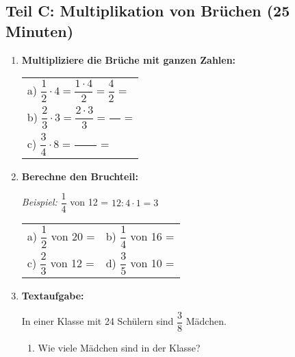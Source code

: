 \subsection*{Teil C: Multiplikation von Brüchen (25 Minuten)}

\begin{enumerate}[resume, label=\arabic*.]
    \item \textbf{Multipliziere die Brüche mit ganzen Zahlen:}

    \vspace{0.5cm}
    \begin{tabular}{l}
        a) $\dfrac{1}{2} \cdot 4 = \dfrac{1 \cdot 4}{2} = \dfrac{4}{2}$ = \underline{\hspace{3cm}} \\[3ex]
        b) $\dfrac{2}{3} \cdot 3 = \dfrac{2 \cdot 3}{3} = \dfrac{\phantom{00}}{\phantom{00}}$ = \underline{\hspace{3cm}} \\[3ex]
        c) $\dfrac{3}{4} \cdot 8 = \dfrac{\phantom{0000}}{\phantom{00}}$ = \underline{\hspace{3cm}}
    \end{tabular}

    \vspace{1cm}

    \item \textbf{Berechne den Bruchteil:}

    \textit{Beispiel:} $\dfrac{1}{4}$ von 12 = $12 : 4 \cdot 1 = 3$

    \vspace{0.5cm}
    \begin{tabular}{ll}
        a) $\dfrac{1}{2}$ von 20 = \underline{\hspace{3cm}} & 
        b) $\dfrac{1}{4}$ von 16 = \underline{\hspace{3cm}} \\[2ex]
        c) $\dfrac{2}{3}$ von 12 = \underline{\hspace{3cm}} & 
        d) $\dfrac{3}{5}$ von 10 = \underline{\hspace{3cm}}
    \end{tabular}

    \vspace{1cm}

    \item \textbf{Textaufgabe:} 

    In einer Klasse mit 24 Schülern sind $\dfrac{3}{8}$ Mädchen.

    \begin{enumerate}[label=\alph*)]
        \item Wie viele Mädchen sind in der Klasse?


\end{enumerate}
\end{enumerate}
